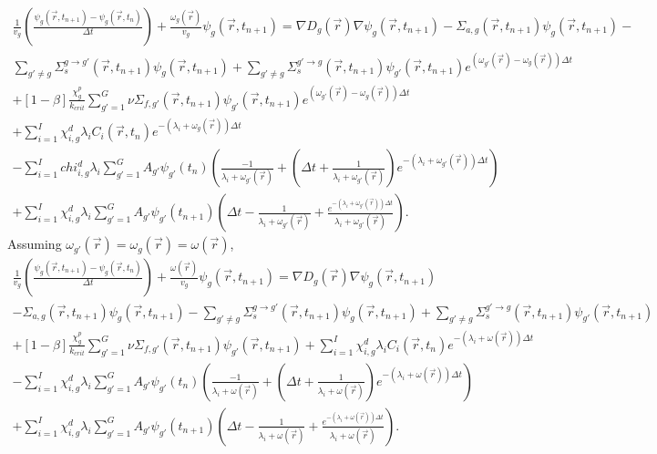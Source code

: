 \documentclass[12pt]{report}
\begin{document}
	\begin{eqnarray}
	\frac{1}{v_g} \left(\frac{\psi_g(\vec{r},t_{n+1}) - \psi_g(\vec{r},t_{n})}{\Delta t} \right) + \frac{\omega_g(\vec{r})}{v_g} \psi_g(\vec{r},t_{n+1})  = \nabla D_g(\vec{r}) \nabla \psi_g(\vec{r},t_{n+1}) - \Sigma_{a,g}(\vec{r},t_{n+1}) \psi_g(\vec{r},t_{n+1}) -  \nonumber \\ \sum_{g'\neq g} \Sigma_{s}^{g\rightarrow g'} (\vec{r},t_{n+1}) \psi_g(\vec{r},t_{n+1}) + \sum_{g' \neq g} \Sigma_{s}^{g'\rightarrow g} (\vec{r},t_{n+1}) \psi_{g'}(\vec{r},t_{n+1}) e^{\left(\omega_{g'}(\vec{r}) - \omega_{g}(\vec{r}) \right) \Delta t} \nonumber \\
	+ \left[ 1- \beta \right] \frac{\chi_g^p}{k_{crit}} \sum_{g'=1}^{G} \nu \Sigma_{f,g'}(\vec{r},t_{n+1}) \psi_{g'}(\vec{r},t_{n+1}) e^{\left(\omega_{g'}(\vec{r}) - \omega_{g}(\vec{r}) \right) \Delta t} \nonumber \\ +  \sum_{i=1}^{I} \chi_{i,g}^d \lambda_i C_i(\vec{r},t_{n}) e^{-\left(\lambda_i + \omega_g(\vec{r})\right) \Delta t} \nonumber \\
	- \sum_{i=1}^{I} chi_{i,g}^d \lambda_i \sum_{g'=1}^{G} A_{g'} \psi_{g'}(t_n) \left( \frac{-1}{\lambda_i + \omega_{g'}(\vec{r})} + \left(\Delta t + \frac{1}{\lambda_i + \omega_{g'}(\vec{r})} \right)e^{-\left(\lambda_i + \omega_{g'}(\vec{r}) \right) \Delta t} \right) \nonumber \\
	+ \sum_{i=1}^{I} \chi_{i,g}^d \lambda_i \sum_{g'=1}^{G} A_{g'} \psi_{g'}(t_{n+1}) \left( \Delta t - \frac{1}{\lambda_i + \omega_{g'}(\vec{r})} + \frac{e^{-\left( \lambda_i + \omega_{g'}(\vec{r}) \right) \Delta t}}{\lambda_i + \omega_{g'}(\vec{r})} \right)
	\nonumber.
	\end{eqnarray}
	Assuming $\omega_{g'}(\vec{r}) = \omega_g(\vec{r}) = \omega(\vec{r})$,
	\begin{eqnarray}
	\frac{1}{v_g} \left(\frac{\psi_g(\vec{r},t_{n+1}) - \psi_g(\vec{r},t_{n})}{\Delta t} \right) + \frac{\omega(\vec{r})}{v_g} \psi_g(\vec{r},t_{n+1})  = \nabla D_g(\vec{r}) \nabla \psi_g(\vec{r},t_{n+1}) \nonumber \\ - \Sigma_{a,g}(\vec{r},t_{n+1}) \psi_g(\vec{r},t_{n+1}) -   \sum_{g'\neq g} \Sigma_{s}^{g\rightarrow g'} (\vec{r},t_{n+1}) \psi_g(\vec{r},t_{n+1}) + \sum_{g' \neq g} \Sigma_{s}^{g'\rightarrow g} (\vec{r},t_{n+1}) \psi_{g'}(\vec{r},t_{n+1}) \nonumber \\
	+ \left[ 1- \beta \right] \frac{\chi_g^p}{k_{crit}} \sum_{g'=1}^{G} \nu \Sigma_{f,g'}(\vec{r},t_{n+1}) \psi_{g'}(\vec{r},t_{n+1})  +  \sum_{i=1}^{I} \chi_{i,g}^d \lambda_i C_i(\vec{r},t_{n}) e^{-\left(\lambda_i + \omega(\vec{r})\right) \Delta t} \nonumber \\
	- \sum_{i=1}^{I} \chi_{i,g}^d \lambda_i \sum_{g'=1}^{G} A_{g'} \psi_{g'}(t_n) \left( \frac{-1}{\lambda_i + \omega(\vec{r})} + \left(\Delta t + \frac{1}{\lambda_i + \omega(\vec{r})} \right)e^{-\left(\lambda_i + \omega(\vec{r}) \right) \Delta t} \right) \nonumber \\
	+ \sum_{i=1}^{I} \chi_{i,g}^d \lambda_i \sum_{g'=1}^{G} A_{g'} \psi_{g'}(t_{n+1}) \left( \Delta t - \frac{1}{\lambda_i + \omega(\vec{r})} + \frac{e^{-\left( \lambda_i + \omega(\vec{r}) \right) \Delta t}}{\lambda_i + \omega(\vec{r})}\right)
	\nonumber.
	\end{eqnarray}
\end{document}
